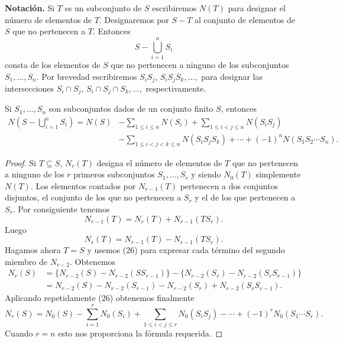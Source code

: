 \documentclass[12pt,a4paper]{book}
\begin{document}
    \textbf{Notación.} Si $T$ es un subconjunto de $S$ escribiremos $N(T)$ para designar
    el número de elementos de $T$. Designaremos por $S-T$ al conjunto de elementos de $S$
    que no pertenecen a $T$. Entonces
    \begin{equation*}
        S-\bigcup_{i=1}^{n}S_{i}
    \end{equation*}
    consta de los elementos de $S$ que no pertenecen a ninguno de los subconjuntos
    $S_{1},\dots,S_{n}$. Por brevedad escribiremos $S_{i}S_{j}$, $S_{i}S_{j}S_{k},\dots,$ para
    designar las intersecciones $S_{i}\cap S_{j}$, $S_{i}\cap S_{j}\cap S_{k},\dots,$
    respectivamente.

    \begin{teorema}
        Si $S_{1},\dots,S_{n}$ son subconjuntos dados de un conjunto finito $S$, entonces
        \begin{align*}
            N\left(S-\bigcup_{i=1}^{n}S_{i}\right)=N(S)&-\sum_{1\leq i\leq n}N(S_{i})
            +\sum_{1\leq i<j\leq n}N(S_{i}S_{j})\\
            &-\sum_{1\leq i<j<k\leq n}N(S_{i}S_{j}S_{k})+\cdots+(-1)^{n}N(S_{1}S_{2}\cdots S_{n}).
        \end{align*}
    \end{teorema}

    \begin{proof}
        Si $T\subseteq S$, $N_{r}(T)$ designa el número de elementos de $T$ que no
        pertenecen a ninguno de los $r$ primeros subconjuntos $S_{1},\dots,S_{r}$ y siendo
        $N_{0}(T)$ simplemente $N(T)$. Los elementos contados por $N_{r-1}(T)$ pertenecen a
        dos conjuntos disjuntos, el conjunto de los que no pertenecen a $S_{r}$ y el de los
        que pertenecen a $S_{r}$. Por consiguiente tenemos
        \begin{equation*}
            N_{r-1}(T)=N_{r}(T)+N_{r-1}(TS_{r}).
        \end{equation*}
        Luego
        \begin{equation}
            N_{r}(T)=N_{r-1}(T)-N_{r-1}(TS_{r}).
        \end{equation}
        Hagamos ahora $T=S$ y usemos (26) para expresar cada término del segundo miembro
        de $N_{r-2}$. Obtenemos
        \begin{align*}
            N_{r}(S)&=\{N_{r-2}(S)-N_{r-2}(SS_{r-1})\}-\{N_{r-2}(S_{r})-N_{r-2}(S_{r}S_{r-1})\}\\
            &=N_{r-2}(S)-N_{r-2}(S_{r-1})-N_{r-2}(S_{r})+N_{r-2}(S_{r}S_{r-1}).
        \end{align*}
        Aplicando repetidamente (26) obtenemos finalmente
        \begin{equation*}
            N_{r}(S)=N_{0}(S)-\sum_{i=1}^{r}N_{0}(S_{i})+\sum_{1\leq i<j\leq r}N_{0}(S_{i}S_{j})-\cdots
            +(-1)^{r}N_{0}(S_{1}\cdots S_{r}).
        \end{equation*}
        Cuando $r=n$ esto nos proporciona la fórmula requerida.
    \end{proof}
\end{document}
